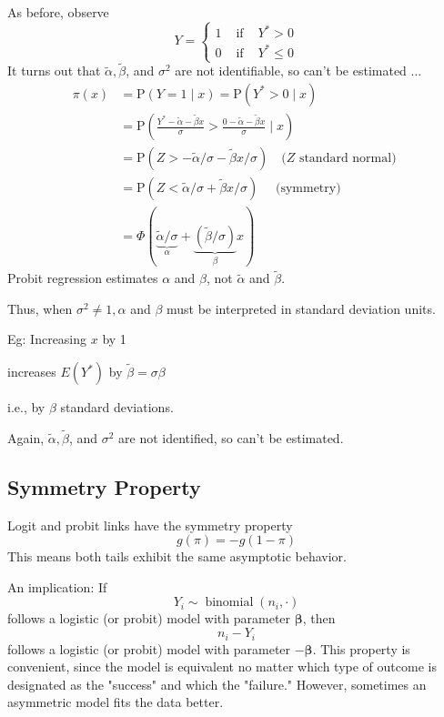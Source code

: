 \documentclass[11pt]{elegantbook}
\begin{document}
As before, observe
$$
Y=\left\{\begin{array}{lll}
1 & \text { if } & Y^*>0 \\
0 & \text { if } & Y^* \leq 0
\end{array}\right.
$$
It turns out that $\tilde{\alpha}, \tilde{\beta}$, and $\sigma^2$ are not identifiable, so can't be estimated ...
$$
\begin{aligned}
\pi(x) & =\mathrm{P}(Y=1 \mid x)=\mathrm{P}\left(Y^*>0 \mid x\right) \\
& =\mathrm{P}\left(\frac{Y^*-\tilde{\alpha}-\tilde{\beta} x}{\sigma}>\frac{0-\tilde{\alpha}-\tilde{\beta} x}{\sigma} \mid x\right) \\
& =\mathrm{P}(Z>-\tilde{\alpha} / \sigma-\tilde{\beta} x / \sigma) \quad(Z \text { standard normal) } \\
& =\mathrm{P}(Z<\tilde{\alpha} / \sigma+\tilde{\beta} x / \sigma) \quad \text { (symmetry) } \\
& =\Phi(\underbrace{\tilde{\alpha} / \sigma}_\alpha+\underbrace{(\tilde{\beta} / \sigma)}_\beta x)
\end{aligned}
$$
Probit regression estimates $\alpha$ and $\beta$, not $\tilde{\alpha}$ and $\tilde{\beta}$.

Thus, when $\sigma^2 \neq 1, \alpha$ and $\beta$ must be interpreted in standard deviation units.

Eg: Increasing $x$ by 1
\begin{center}
    increases $E\left(Y^*\right)$ by $\tilde{\beta}=\sigma \beta$
\end{center}
i.e., by $\beta$ standard deviations.

Again, $\tilde{\alpha}, \tilde{\beta}$, and $\sigma^2$ are not identified, so can't be estimated.

\subsection{Symmetry Property}
Logit and probit links have the symmetry property
$$g(\pi) = -g(1 - \pi)$$
This means both tails exhibit the same asymptotic behavior.

An implication: If
$$
Y_i \sim \operatorname{binomial}\left(n_i, \cdot\right)
$$
follows a logistic (or probit) model with parameter $\boldsymbol{\beta}$, then
$$
n_i-Y_i
$$
follows a logistic (or probit) model with parameter $-\boldsymbol{\beta}$.
This property is convenient, since the model is equivalent no matter which type of outcome is designated as the "success" and which the "failure."
However, sometimes an asymmetric model fits the data better.
\end{document}

